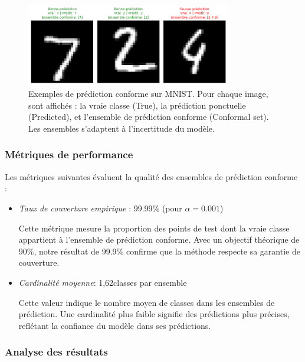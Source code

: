 \documentclass[a4paper,12pt]{article}
\begin{document}
\begin{figure}[h]
\centering
\includegraphics[width=0.8\textwidth]{conformal_prediction_classification.png}
\caption{Exemples de prédiction conforme sur MNIST. Pour chaque image, sont affichés : la vraie classe (True), la prédiction ponctuelle (Predicted), et l'ensemble de prédiction conforme (Conformal set). Les ensembles s'adaptent à l'incertitude du modèle.}
\label{fig:mnist_conforme}
\end{figure}

\subsubsection{Métriques de performance}

Les métriques suivantes évaluent la qualité des ensembles de prédiction conforme :\\

\begin{itemize}
\item \textit{Taux de couverture empirique} : 99.99\% (pour $\alpha = 0.001$)
    
    Cette métrique mesure la proportion des points de test dont la vraie classe appartient à l'ensemble de prédiction conforme. Avec un objectif théorique de 90\%, notre résultat de 99.9\% confirme que la méthode respecte sa garantie de couverture.\\

\item \textit{Cardinalité moyenne}: 1,62classes par ensemble
    
    Cette valeur indique le nombre moyen de classes dans les ensembles de prédiction. Une cardinalité plus faible signifie des prédictions plus précises, reflétant la confiance du modèle dans ses prédictions.\\


\end{itemize}

\subsubsection{Analyse des résultats}
\end{document}
